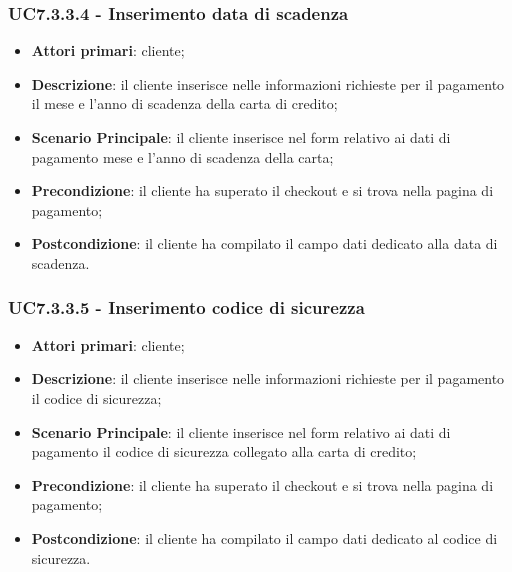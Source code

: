 \subsubsection{UC7.3.3.4 - Inserimento data di scadenza}
\begin{itemize}
\item \textbf{Attori primari}: cliente;
\item \textbf{Descrizione}: il cliente inserisce nelle informazioni richieste per il pagamento il mese e l'anno di scadenza della carta di credito;
\item \textbf{Scenario Principale}: il cliente inserisce nel form relativo ai dati di pagamento mese e l'anno di scadenza della carta;
\item \textbf{Precondizione}: il cliente ha superato il checkout e si trova nella pagina di pagamento;
\item \textbf{Postcondizione}: il cliente ha compilato il campo dati dedicato alla data di scadenza.
\end{itemize}

\subsubsection{UC7.3.3.5 - Inserimento codice di sicurezza}
\begin{itemize}
\item \textbf{Attori primari}: cliente;
\item \textbf{Descrizione}: il cliente inserisce nelle informazioni richieste per il pagamento il codice di sicurezza;
\item \textbf{Scenario Principale}: il cliente inserisce nel form relativo ai dati di pagamento il codice di sicurezza collegato alla carta di credito;
\item \textbf{Precondizione}: il cliente ha superato il checkout e si trova nella pagina di pagamento;
\item \textbf{Postcondizione}: il cliente ha compilato il campo dati dedicato al codice di sicurezza.
\end{itemize}

